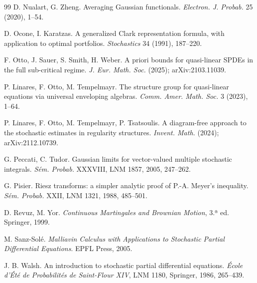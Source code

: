 \begin{thebibliography}{99}
 D. Nualart, G. Zheng. Averaging Gaussian functionals. \emph{Electron. J. Probab.} 25 (2020), 1--54.

 D. Ocone, I. Karatzas. A generalized Clark representation formula, with application to optimal
portfolios. \emph{Stochastics} 34 (1991), 187--220.

 F. Otto, J. Sauer, S. Smith, H. Weber. A priori bounds for quasi-linear SPDEs in the full sub-critical
regime. \emph{J. Eur. Math. Soc.} (2025); arXiv:2103.11039.

 P. Linares, F. Otto, M. Tempelmayr. The structure group for quasi-linear equations via universal
enveloping algebras. \emph{Comm. Amer. Math. Soc.} 3 (2023), 1--64.

 P. Linares, F. Otto, M. Tempelmayr, P. Tsatsoulis. A diagram-free approach to the stochastic
estimates in regularity structures. \emph{Invent. Math.} (2024); arXiv:2112.10739.

 G. Peccati, C. Tudor. Gaussian limits for vector-valued multiple stochastic integrals. \emph{Sém. Probab.}
XXXVIII, LNM 1857, 2005, 247--262.

 G. Pisier. Riesz transforms: a simpler analytic proof of P.-A. Meyer's inequality. \emph{Sém. Probab.} XXII,
LNM 1321, 1988, 485--501.

 D. Revuz, M. Yor. \emph{Continuous Martingales and Brownian Motion}, 3.ª ed. Springer, 1999.

 M. Sanz-Solé. \emph{Malliavin Calculus with Applications to Stochastic Partial Differential Equations}.
EPFL Press, 2005.

 J. B. Walsh. An introduction to stochastic partial differential equations. \emph{École d'Été de Probabilités
de Saint-Flour XIV}, LNM 1180, Springer, 1986, 265--439.
\end{thebibliography}
